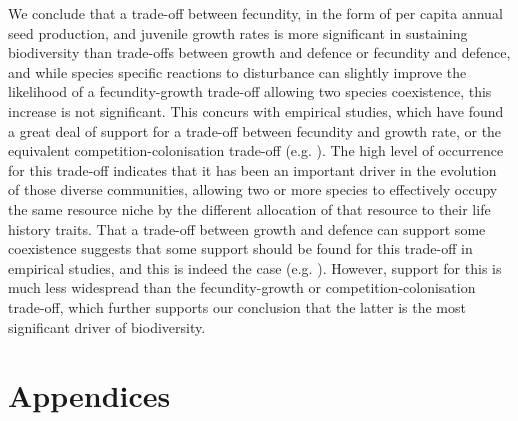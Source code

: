 We conclude that a trade-off between fecundity, in the form of per capita annual seed production, and juvenile growth rates is more significant in sustaining biodiversity than trade-offs between growth and defence or fecundity and defence, and while species specific reactions to disturbance can slightly improve the likelihood of a fecundity-growth trade-off allowing two species coexistence, this increase is not significant. This concurs with empirical studies, which have found a great deal of support for a trade-off between fecundity and growth rate, or the equivalent competition-colonisation trade-off (e.g. \cite{levins1971regional,yu2001competition,tilman1994competition,adler2000space}). The high level of occurrence for this trade-off indicates that it has been an important driver in the evolution of those diverse communities, allowing two or more species to effectively occupy the same resource niche by the different allocation of that resource to their life history traits. That a trade-off between growth and defence can support some coexistence suggests that some support should be found for this trade-off in empirical studies, and this is indeed the case (e.g. \cite{wright2010functional,fine2006growth}). However, support for this is much less widespread than the fecundity-growth or competition-colonisation trade-off, which further supports our conclusion that the latter is the most significant driver of biodiversity.

\section*{Appendices}

\bappendix
